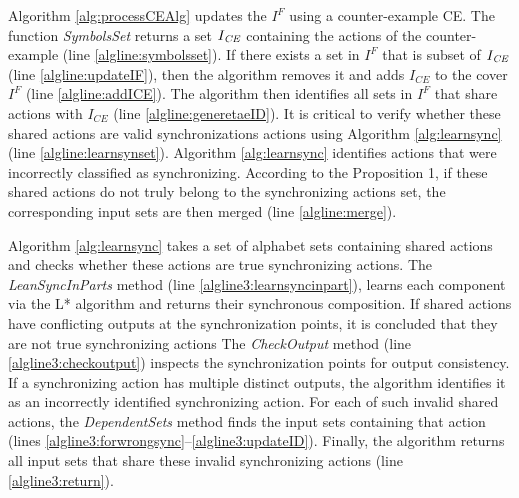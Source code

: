  
 		Algorithm \ref{alg:processCEAlg}  updates the  %
   $I^F$ using a counter-example CE.
The function \textit{SymbolsSet} returns a set $I_{\it CE}$ containing the actions of the counter-example (line \ref{algline:symbolsset}).
If there exists a set in $I^F$ that is subset of $I_{\it CE}$ (line \ref{algline:updateIF}), then
the algorithm removes it and adds $I_{CE}$ to the cover $I^F$ (line \ref{algline:addICE}). The algorithm then identifies all sets in $I^F$ that share actions with $I_{CE}$ (line \ref{algline:generetaeID}). It is critical to verify whether these shared actions are valid synchronizations actions using Algorithm \ref{alg:learnsync} (line \ref{algline:learnsynset}). Algorithm \ref{alg:learnsync} identifies actions that were incorrectly classified as synchronizing.
 According to the Proposition 1, 
 if these shared actions do not truly belong  to the synchronizing actions set, the corresponding input sets are then merged (line \ref{algline:merge}).



	Algorithm \ref{alg:learnsync} takes a set of alphabet sets containing shared actions and checks whether these  actions are true synchronizing actions. The \emph{LeanSyncInParts} method (line \ref{algline3:learnsyncinpart}), learns each component via the L* algorithm and returns their synchronous composition. If shared actions have conflicting outputs at  the synchronization points, it is concluded that they are not true synchronizing actions
     The \emph{CheckOutput} method (line \ref{algline3:checkoutput}) inspects the synchronization points for output consistency.
     If a synchronizing action has multiple distinct outputs, the algorithm identifies it as an incorrectly identified synchronizing action.
   For each of such invalid shared actions,  the \emph{DependentSets} method finds the input sets containing that action (lines \ref{algline3:forwrongsync}--\ref{algline3:updateID}). Finally, the algorithm returns all input sets that share these invalid synchronizing actions (line \ref{algline3:return}). 
     
 

